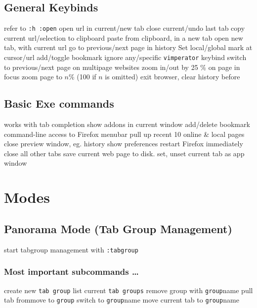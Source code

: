 \subsection{General Keybinds}	{refer to {\tt :h :open}}
	{open url in current/new tab}
	{close current/undo last tab}
	{copy current url/selection to clipboard}
	{paste from clipboard, in a new tab}
	{open new tab, with current url}
	{go to previous/next page in history}
	{Set local/global mark at cursor/url}
	{add/toggle bookmark}
	{ignore any/specific {\tt vimperator} keybind}
\cmdS{\lbracket\lbracket~\rbracket\rbracket}	{switch to previous/next page on multipage websites}
\cmdS{+~-}	{zoom in/out by 25 \% on page in focus}
	{zoom page to $n$\% (100 if $n$ is omitted)}
	{exit browser, clear history before}

\subsection{Basic Exe commands}{works with tab completion}
	{show addons in current window}
	{add/delete bookmark}
	{command-line access to Firefox menubar}
	{pull up recent 10 online \& local pages}
	{close preview window, eg. history}
	{show preferences}
	{restart Firefox immediately}
	{close all other tabs}
	{save current web page to disk.}
	{set, unset current tab as app window}

\section{Modes}{}
\subsection{Panorama Mode (Tab Group Management)}{start tabgroup management with {\tt :tabgroup }}
\subsubsection{Most important subcommands \ldots}{}
	{create new {\tt tab group}}
	{list current {\tt tab groups}}
	{remove group with {\tt group}name}
	{pull tab from\or move to {\tt group}}
	{switch to {\tt group}name}
	{move current tab to {\tt group}name}

